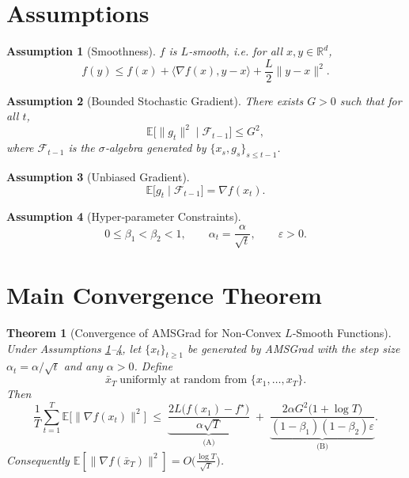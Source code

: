 \documentclass[11pt]{article}
\newtheorem{theorem}{Theorem}[section]
\newtheorem{assumption}{Assumption}[section]
\begin{document}
\section*{Assumptions}
\begin{assumption}[Smoothness]\label{as:smooth}
$f$ is $L$‑smooth, i.e. for all $x,y\in\mathbb{R}^d$,
\[
f(y)\le f(x)+\langle \nabla f(x),y-x\rangle+\frac{L}{2}\|y-x\|^2 .
\]
\end{assumption}
\begin{assumption}[Bounded Stochastic Gradient]\label{as:bound}
There exists $G>0$ such that for all $t$,
\[
\mathbb{E}\big[\|g_t\|^2\mid \mathcal{F}_{t-1}\big]\le G^2,
\]
where $\mathcal{F}_{t-1}$ is the $\sigma$‑algebra generated by $\{x_s,g_s\}_{s\le t-1}$.
\end{assumption}
\begin{assumption}[Unbiased Gradient]\label{as:unbiased}
\[
\mathbb{E}\big[g_t\mid \mathcal{F}_{t-1}\big]=\nabla f(x_t).
\]
\end{assumption}
\begin{assumption}[Hyper‑parameter Constraints]\label{as:hyper}
\[
0\le \beta_1<\beta_2<1,\qquad \alpha_t=\frac{\alpha}{\sqrt{t}},\qquad \varepsilon>0.
\]
\end{assumption}

\section*{Main Convergence Theorem}
\begin{theorem}[Convergence of AMSGrad for Non‑Convex $L$‑Smooth Functions]\label{thm:main}
Under Assumptions \ref{as:smooth}–\ref{as:hyper}, let $\{x_t\}_{t\ge1}$ be generated by AMSGrad with the step size $\alpha_t=\alpha/\sqrt{t}$ and any $\alpha>0$. Define
\[
\bar{x}_T\;\text{uniformly at random from }\{x_1,\dots,x_T\}.
\]
Then
\[
\frac{1}{T}\sum_{t=1}^{T}\mathbb{E}\big[\|\nabla f(x_t)\|^2\big]
\;\le\;
\underbrace{\frac{2L\big(f(x_1)-f^\star\big)}{\alpha\sqrt{T}}}_{\text{(A)}}
\;+\;
\underbrace{\frac{2\alpha G^2\big(1+\log T\big)}{(1-\beta_1)(1-\beta_2)\varepsilon}}_{\text{(B)}} .
\tag{2}
\]
Consequently $\mathbb{E}[\|\nabla f(\bar{x}_T)\|^2]=O\!\big(\tfrac{\log T}{\sqrt{T}}\big)$.
\end{theorem}

\end{document}
